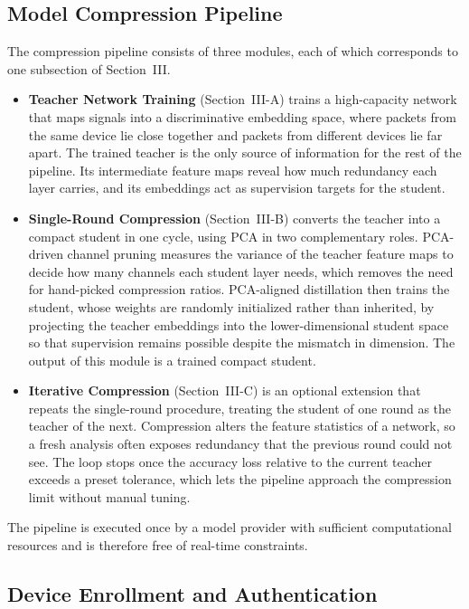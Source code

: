 \documentclass[journal,comsoc]{IEEEtran}
\begin{document}
\subsection{Model Compression Pipeline}

The compression pipeline consists of three modules, each of which corresponds to one subsection of Section~III.
\begin{itemize}
    \item \textbf{Teacher Network Training} (Section~III-A) trains a high-capacity network that maps signals into a discriminative embedding space, where packets from the same device lie close together and packets from different devices lie far apart. The trained teacher is the only source of information for the rest of the pipeline. Its intermediate feature maps reveal how much redundancy each layer carries, and its embeddings act as supervision targets for the student.
    \item \textbf{Single-Round Compression} (Section~III-B) converts the teacher into a compact student in one cycle, using PCA in two complementary roles. PCA-driven channel pruning measures the variance of the teacher feature maps to decide how many channels each student layer needs, which removes the need for hand-picked compression ratios. PCA-aligned distillation then trains the student, whose weights are randomly initialized rather than inherited, by projecting the teacher embeddings into the lower-dimensional student space so that supervision remains possible despite the mismatch in dimension. The output of this module is a trained compact student.
    \item \textbf{Iterative Compression} (Section~III-C) is an optional extension that repeats the single-round procedure, treating the student of one round as the teacher of the next. Compression alters the feature statistics of a network, so a fresh analysis often exposes redundancy that the previous round could not see. The loop stops once the accuracy loss relative to the current teacher exceeds a preset tolerance, which lets the pipeline approach the compression limit without manual tuning.
\end{itemize}
The pipeline is executed once by a model provider with sufficient computational resources and is therefore free of real-time constraints.

\subsection{Device Enrollment and Authentication}
\end{document}
